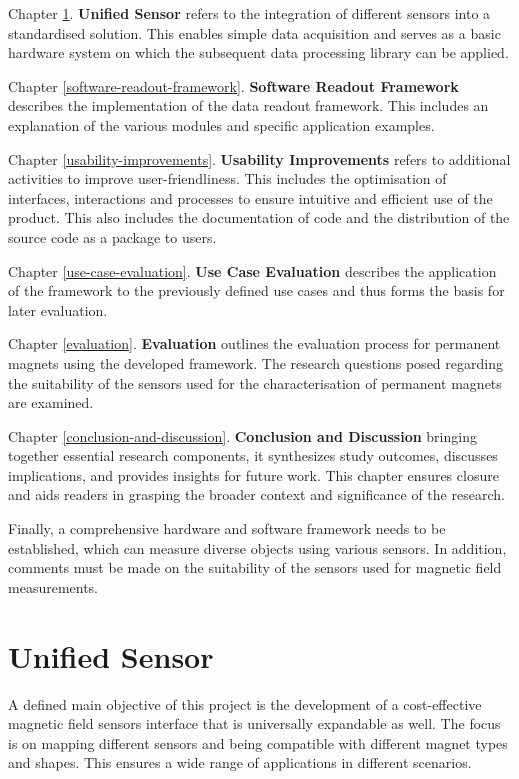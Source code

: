Chapter \ref{unified-sensor}. \textbf{Unified Sensor} refers to the
integration of different sensors into a standardised solution. This
enables simple data acquisition and serves as a basic hardware system on
which the subsequent data processing library can be applied.

Chapter \ref{software-readout-framework}. \textbf{Software Readout
Framework} describes the implementation of the data readout framework.
This includes an explanation of the various modules and specific
application examples.

Chapter \ref{usability-improvements}. \textbf{Usability Improvements}
refers to additional activities to improve user-friendliness. This
includes the optimisation of interfaces, interactions and processes to
ensure intuitive and efficient use of the product. This also includes
the documentation of code and the distribution of the source code as a
package to users.

Chapter \ref{use-case-evaluation}. \textbf{Use Case Evaluation}
describes the application of the framework to the previously defined use
cases and thus forms the basis for later evaluation.

Chapter \ref{evaluation}. \textbf{Evaluation} outlines the evaluation
process for permanent magnets using the developed framework. The
research questions posed regarding the suitability of the sensors used
for the characterisation of permanent magnets are examined.

Chapter \ref{conclusion-and-discussion}. \textbf{Conclusion and
Discussion} bringing together essential research components, it
synthesizes study outcomes, discusses implications, and provides
insights for future work. This chapter ensures closure and aids readers
in grasping the broader context and significance of the research.

Finally, a comprehensive hardware and software framework needs to be
established, which can measure diverse objects using various sensors. In
addition, comments must be made on the suitability of the sensors used
for magnetic field measurements.

\hypertarget{unified-sensor}{%
\chapter{Unified Sensor}\label{unified-sensor}}

A defined main objective of this project is the development of a
cost-effective magnetic field sensors interface that is universally
expandable as well. The focus is on mapping different sensors and being
compatible with different magnet types and shapes. This ensures a wide
range of applications in different scenarios.

